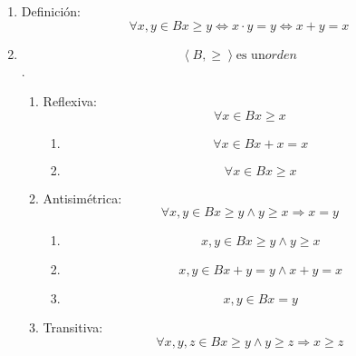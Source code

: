 \begin{enumerate}
\begin{enumerate}
\begin{enumerate}
\begin{enumerate}
        \begin{enumerate}
        \def\labelenumv{\arabic{enumv}.}
        \tightlist
        \item
          \[{x \leq {y \land y}} \leq z\]
        \item
          \[{{x \cdot y} = {{x \land y} \cdot z}} = y\]
        \item
          \[{{x \cdot y} \cdot z} = {x \cdot z}\]
        \item
          \[{x \cdot y} = {x \cdot z}\]
        \item
          \[x = {x \cdot z}\]
        \item
          \[x \leq z\]
        \end{enumerate}
      \end{enumerate}
    \item
      Definición:\[\forall x,{y \in B}{x \geq y}\Leftrightarrow{{x \cdot y} = y}\Leftrightarrow{{x + y} = x}\]
    \item
      \[\left\langle {B, \geq} \right\rangle\text{es un}\mathit{orden}\].

      \begin{enumerate}
      \def\labelenumiv{\arabic{enumiv}.}
      \item
        Reflexiva: \[\forall{x \in B}{x \geq x}\]

        \begin{enumerate}
        \def\labelenumv{\arabic{enumv}.}
        \tightlist
        \item
          \[\forall{x \in B}{{x + x} = x}\]
        \item
          \[\forall{x \in B}{x \geq x}\]
        \end{enumerate}
      \item
        Antisimétrica:
        \[\forall x,{y \in B}{{x \geq {y \land y}} \geq x}\Rightarrow{x = y}\]

        \begin{enumerate}
        \def\labelenumv{\arabic{enumv}.}
        \tightlist
        \item
          \[x,{y \in B}{{x \geq {y \land y}} \geq x}\]
        \item
          \[x,{y \in B}{{{x + y} = {{y \land x} + y}} = x}\]
        \item
          \[x,{y \in B}{x = y}\]
        \end{enumerate}
      \item
        Transitiva:
        \[\forall x,y,{z \in B}{{x \geq {y \land y}} \geq z}\Rightarrow{x \geq z}\]


\end{enumerate}
\end{enumerate}
\end{enumerate}
\end{enumerate}
